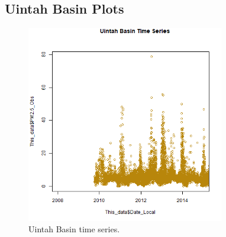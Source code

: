 
\subsection{Uintah Basin Plots}
\begin{figure} 
\centering 
\includegraphics[width=0.77\textwidth]{Code_Outputs/UintahBasin_time_series.png} 
\caption{\label{fig:UintahBasinTS}Uintah Basin time series.} 
\end{figure} 
 
